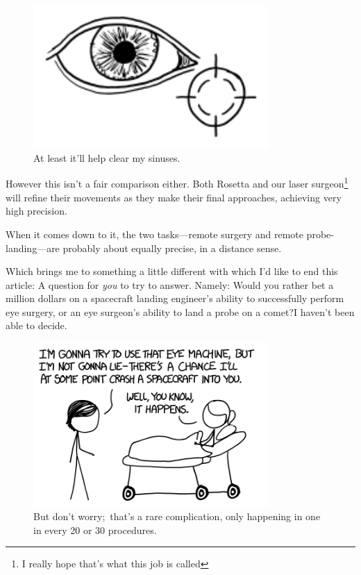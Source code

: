 {\begin{figure}[!htbp]
\centering
\includegraphics[scale=0.5, max width=0.8\textwidth]{imgs/a/82/rosetta_eye.png}
\caption{At least it'll help clear my sinuses.}
\end{figure}

{However this isn't a fair comparison either. Both Rosetta and our laser surgeon{\footnote{I really hope that's what this job is called} } will refine their movements as they make their final approaches, achieving very high precision.}

{When it comes down to it, the two tasks—remote surgery and remote probe-landing—are probably about equally precise, in a distance sense.}

{Which brings me to something a little different with which I'd like to end this article: A question for \emph{you} to try to answer. Namely:}
Would you rather bet a million dollars on a spacecraft landing engineer's ability to successfully perform eye surgery, or an eye surgeon's ability to land a probe on a comet?I haven't been able to decide.
\begin{figure}[!htbp]
\centering
\includegraphics[scale=0.5, max width=0.8\textwidth]{imgs/a/82/rosetta_surgery.png}
\caption{But don't worry; that's a rare complication, only happening in one in every 20 or 30 procedures.}
\end{figure}

}
